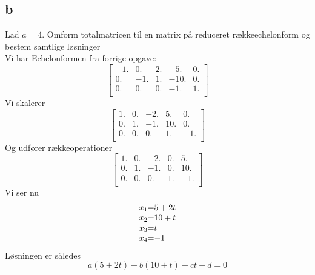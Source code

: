 \documentclass[a4paper,fleqn]{report}
\begin{document}
	\subsection{b}
	Lad $a = 4$. Omform totalmatricen til en matrix på reduceret rækkeechelonform og bestem
	samtlige løsninger\\
	Vi har Echelonformen fra forrige opgave:
	\[
		\begin{bmatrix}
		  -1. & 0. & 2. & -5. & 0.\\
		  0. & -1. & 1. & -10. & 0.\\
		  0. & 0. & 0. & -1. & 1.\\
		\end{bmatrix}
	\]
	Vi skalerer
	\[ 
		\begin{bmatrix}
		  1. & 0. & -2. & 5. & 0.\\
		  0. & 1. & -1. & 10. & 0.\\
		  0. & 0. & 0. & 1. & -1.\\
		\end{bmatrix}
	\]
	Og udfører rækkeoperationer
	\[
		\begin{bmatrix}
		  1. & 0. & -2. & 0. & 5.\\
		  0. & 1. & -1. & 0. & 10.\\
		  0. & 0. & 0. & 1. & -1.\\
		\end{bmatrix}
	\]
	Vi ser nu
	\[\begin{array}{r@{=}l}
		x_1 & 5+2t\\
		x_2 & 10+t\\
		x_3 & t\\
		x_4 & -1
	\end{array}\]
	Løsningen er således
	\[
		a(5+2t) + b(10+t) + ct - d = 0
	\]
\end{document}
